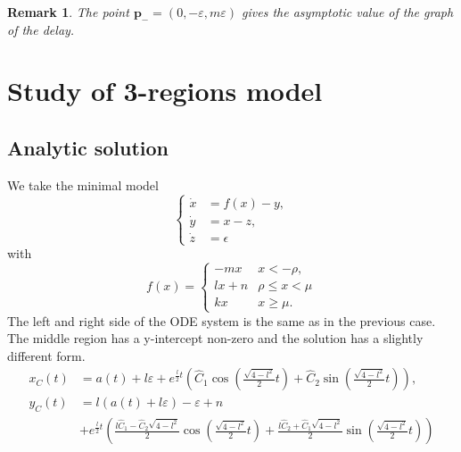 \documentclass[a4paper,preprint,11pt]{article}
\newtheorem{remark}[theorem]{Remark}
\begin{document}
\begin{remark}
 The point $\mathbf{p}_-=(0,-\varepsilon,m\varepsilon)$ gives the asymptotic value of the graph of the delay. 
\end{remark}














\section{Study of 3-regions model}

\subsection{Analytic solution}
We take the minimal model
$$
\left\{
\begin{array}{cl}
\dot{x} & = f(x)-y,  \\
\dot{y} & = x-z, \\
\dot{z} & = \epsilon
\end{array}
\right.
$$
with 
$$
f(x) = \left\{
\begin{array}{cc}
-mx & x< -\rho, \\
lx+n & \rho \leq x < \mu \\
kx & x\geq\mu.
\end{array}
\right.
$$
The left and right side of the ODE system is the same as in the previous case. The middle region has a y-intercept non-zero and the solution has a slightly different form.
\begin{align*}
x_C(t) & =a(t) + l\varepsilon +
  e^{\frac{l}{2}t} \left(
      \hat{C}_1 \cos\left(\frac {\sqrt{4-l^2}}2t \right)+
      \hat{C}_2 \sin\left(\frac {\sqrt{4-l^2}}2t \right)
    \right),\\
y_C(t)&=l(a(t)+l\varepsilon)-\varepsilon+n \\
  &+e^{\frac {l}{2}t} \left(
      \frac{l\hat{C}_1-\hat{C}_2\sqrt{4-l^2}}2 \cos\left(\frac {\sqrt{4-l^2}}2t \right)
      +\frac{l\hat{C}_2+\hat{C}_1\sqrt{4-l^2}}2 \sin\left(\frac {\sqrt{4-l^2}}2t \right)
    \right)
\end{align*}
\end{document}
